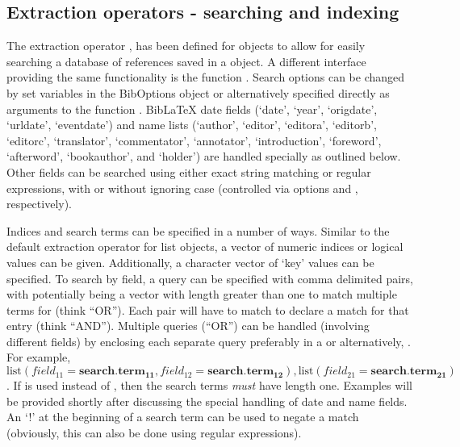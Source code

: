 \documentclass[article]{jss}\usepackage[]{graphicx}\usepackage[]{color}
\newcommand{\bt}{\`{}}
\begin{document}
\subsection{Extraction operators - searching and indexing}\label{searchsec}
The extraction operator \code{\bt[\bt}, has been defined for  objects to allow for easily searching a database of references saved in a  object.  A different interface providing the same functionality is the function .  Search options can be changed by set variables in the BibOptions object or alternatively specified directly as arguments to the function .  BibLaTeX date fields (`date', `year', `origdate', `urldate', `eventdate') and name lists (`author', `editor', `editora', `editorb', `editorc', `translator', `commentator', `annotator', `introduction', `foreword', `afterword', `bookauthor', and `holder') are handled specially as outlined below.  Other fields can be searched using either exact string matching or regular expressions, with or without ignoring case (controlled via options  and , respectively).

Indices and search terms can be specified in a number of ways.  Similar to the default extraction operator for list objects, a vector of numeric indices or logical values can be given.  Additionally, a character vector of `key' values can be specified.  To search by field, a query can be specified with comma delimited  pairs, with  potentially being a vector with length greater than one to match multiple terms for  (think ``OR'').  Each  pair will have to match to declare a match for that entry (think ``AND'').  Multiple queries (``OR'') can be handled (involving different fields) by enclosing each separate query preferably in a  or alternatively, .  For example, $\text{list}(field_{11} = \mathbf{search.term_{11}},field_{12}=\mathbf{search.term_{12}}),\text{list}(field_{21}=\mathbf{search.term_{21}})$.  If  is used instead of , then the search terms \emph{must} have length one.  Examples will be provided shortly after discussing the special handling of date and name fields.  An `!' at the beginning of a search term can be used to negate a match (obviously, this can also be done using regular expressions).
\end{document}
